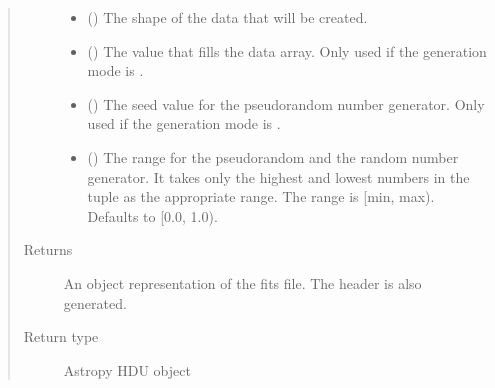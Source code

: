 \documentclass[letterpaper,10pt,english]{sphinxmanual}
\begin{document}
\begin{fulllineitems}
\begin{quote}
\begin{description}
\begin{itemize}
\begin{itemize}
\begin{description}
\end{description}

\end{itemize}


\item {} 
 () \textendash{} The shape of the data that will be created.

\item {} 
 (\sphinxstyleliteralemphasis{\sphinxupquote{ (}}\sphinxstyleliteralemphasis{\sphinxupquote{)}}) \textendash{} The value that fills the data array. Only used if
the generation mode is .

\item {} 
 (\sphinxstyleliteralemphasis{\sphinxupquote{ (}}\sphinxstyleliteralemphasis{\sphinxupquote{)}}) \textendash{} The seed value for the pseudorandom number generator. Only
used if the generation mode is .

\item {} 
 (\sphinxstyleliteralemphasis{\sphinxupquote{ (}}\sphinxstyleliteralemphasis{\sphinxupquote{)}}) \textendash{} The range for the pseudorandom and the random number
generator. It takes only the highest and lowest numbers in
the tuple as the appropriate range. The range is {[}min, max).
Defaults to {[}0.0, 1.0).

\end{itemize}

\item[{Returns}] \leavevmode
{} \textendash{} An object representation of the fits file. The header is
also generated.

\item[{Return type}] \leavevmode
Astropy HDU object

\end{description}\end{quote}

\end{fulllineitems}
\end{document}
